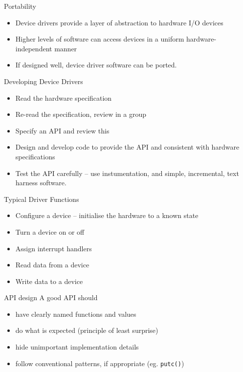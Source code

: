 \documentclass[svgnames,x11names]{beamer}
\begin{document}
\begin{frame}{Portability}
  \begin{itemize}
  \item Device drivers provide a layer of abstraction to hardware I/O devices
  \item Higher levels of software can access devices in a uniform
    hardware-independent manner
  \item If designed well, device driver software can be ported.
  \end{itemize}
\end{frame}

\begin{frame}{Developing Device Drivers}
  \begin{itemize}
  \item Read the hardware specification
  \item Re-read the specification, review in a group
  \item Specify an API and review this
  \item Design and develop code to provide the API and consistent with
    hardware specifications
  \item Test the API carefully -- use instumentation, and simple,
    incremental, text harness software.
  \end{itemize}
\end{frame}

\begin{frame}{Typical Driver Functions}
  \begin{itemize}
  \item Configure a device -- initialise the hardware to a known state
  \item Turn a device on or off
  \item Assign interrupt handlers
  \item Read data from a device
  \item Write data to a device
  \end{itemize}
\end{frame}

\begin{frame}{API design}
  A good API should
  \begin{itemize}
  \item have clearly named functions and values
  \item do what is expected (principle of least surprise)
  \item hide unimportant implementation details
  \item follow conventional patterns, if appropriate (eg. \texttt{putc()})
  \end{itemize}
\end{frame}
\end{document}
